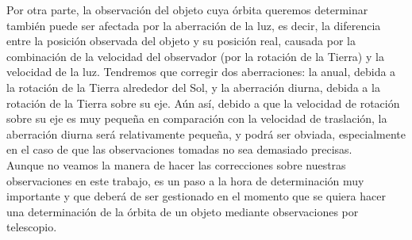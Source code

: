 Por otra parte, la observación del objeto cuya órbita queremos determinar también puede ser afectada por la aberración de la luz, es decir, la diferencia entre la posición observada del objeto y su posición real, causada por la combinación de la velocidad del observador (por la rotación de la Tierra) y la velocidad de la luz. Tendremos que corregir dos aberraciones: la anual, debida a la rotación de la Tierra alrededor del Sol, y la aberración diurna, debida a la rotación de la Tierra sobre su eje. Aún así, debido a que la velocidad de rotación sobre su eje es muy pequeña en comparación con la velocidad de traslación, la aberración diurna será relativamente pequeña, y podrá ser obviada, especialmente en el caso de que las observaciones tomadas no sea demasiado precisas. \cite{moulton}\\

Aunque no veamos la manera de hacer las correcciones sobre nuestras observaciones en este trabajo, es un paso a la hora de determinación muy importante y que deberá de ser gestionado en el momento que se quiera hacer una determinación de la órbita de un objeto mediante observaciones por telescopio.\\


